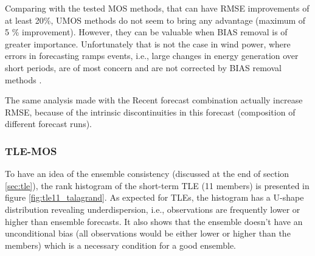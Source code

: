 Comparing with the tested MOS methods, that can have RMSE improvements of at least 20\%, UMOS methods do not seem to bring any advantage (maximum of 5 \% improvement). However, they can be valuable when BIAS removal is of greater importance. Unfortunately that is not the case in wind power, where errors in forecasting ramps events, i.e., large changes in energy generation over short periods, are of most concern and are not corrected by BIAS removal methods \citep{Marquis2011}.


\begin{figure}[!htp]
    \centering
    \label{fig:StullYussouf}
\end{figure}
\FloatBarrier

The same analysis made with the Recent forecast combination actually increase RMSE, because of the intrinsic discontinuities in this forecast (composition of different forecast runs).

\begin{figure}[!htp]
    \centering
    \label{fig:StullYussouf_Recent}
\end{figure}

\FloatBarrier
\subsubsection{TLE-MOS}
\label{sec:eolica_tle}

To have an idea of the ensemble consistency (discussed at the end of section \ref{sec:tle}), the rank histogram of the short-term TLE (11 members) is presented in figure \ref{fig:tle11_talagrand}. As expected for TLEs, the histogram has a U-shape distribution revealing underdispersion, i.e., observations are frequently lower or higher than ensemble forecasts. It also shows that the ensemble doesn't have an unconditional bias (all observations would be either lower or higher than the members) which is a necessary condition for a good ensemble.


